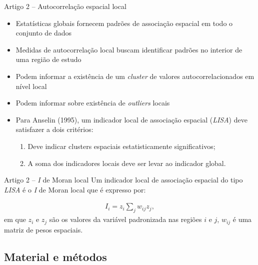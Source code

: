 \documentclass[aspectratio=169]{beamer}
\begin{document}
\begin{frame}{Artigo 2 -- Autocorrelação espacial local}
	\begin{itemize}
		\item Estatísticas globais fornecem padrões de associação espacial em todo o conjunto de dados
		\item Medidas de autocorrelação local buscam identificar padrões no interior de uma região de estudo  
		\item Podem informar a existência de um \textit{cluster} de valores autocorrelacionados em nível local
		\item Podem informar sobre existência de \textit{outliers} locais
		\item Para Anselin (1995), um indicador local de associação espacial (\textit{LISA}) deve satisfazer a dois critérios:
		\vspace{0.25cm}
		\begin{enumerate}
			\item Deve indicar clusters espaciais estatisticamente significativos;
			\item A soma dos indicadores locais deve ser levar ao indicador global.
		\end{enumerate}
	\end{itemize}
\end{frame}

\begin{frame}{Artigo 2 -- \textit{I} de Moran local}
	Um indicador local de associação espacial do tipo \textit{LISA} é o \textit{I} de Moran local que é expresso por: 
	\begin{block}{}
		\small
		\vspace{0.25cm}
		\begin{align*}
		I_i = z_i \sum_{j}^{} w_{ij} z_j,
		\end{align*}
		\noindent \small em que $z_i$ e $z_j$ são os valores da variável padronizada nas regiões $i$ e $j$, $w_{ij}$ é uma matriz de pesos espaciais.
	\end{block}	
\end{frame}

\subsection{Material e métodos}
\end{document}
